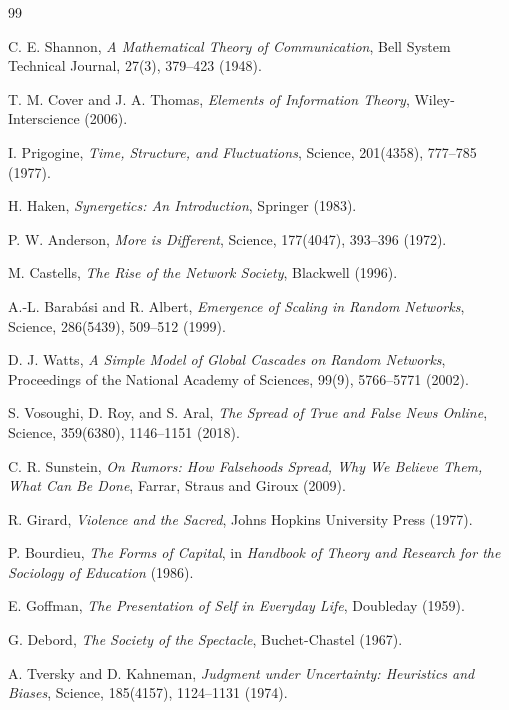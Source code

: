 \documentclass[12pt,a4paper]{article}
\begin{document}
\begin{thebibliography}{99}

C. E. Shannon,
\textit{A Mathematical Theory of Communication},
Bell System Technical Journal, 27(3), 379--423 (1948).

T. M. Cover and J. A. Thomas,
\textit{Elements of Information Theory},
Wiley-Interscience (2006).

I. Prigogine,
\textit{Time, Structure, and Fluctuations},
Science, 201(4358), 777--785 (1977).

H. Haken,
\textit{Synergetics: An Introduction},
Springer (1983).

P. W. Anderson,
\textit{More is Different},
Science, 177(4047), 393--396 (1972).

M. Castells,
\textit{The Rise of the Network Society},
Blackwell (1996).

A.-L. Barabási and R. Albert,
\textit{Emergence of Scaling in Random Networks},
Science, 286(5439), 509--512 (1999).

D. J. Watts,
\textit{A Simple Model of Global Cascades on Random Networks},
Proceedings of the National Academy of Sciences, 99(9), 5766--5771 (2002).

S. Vosoughi, D. Roy, and S. Aral,
\textit{The Spread of True and False News Online},
Science, 359(6380), 1146--1151 (2018).

C. R. Sunstein,
\textit{On Rumors: How Falsehoods Spread, Why We Believe Them, What Can Be Done},
Farrar, Straus and Giroux (2009).

R. Girard,
\textit{Violence and the Sacred},
Johns Hopkins University Press (1977).

P. Bourdieu,
\textit{The Forms of Capital},
in \textit{Handbook of Theory and Research for the Sociology of Education} (1986).

E. Goffman,
\textit{The Presentation of Self in Everyday Life},
Doubleday (1959).

G. Debord,
\textit{The Society of the Spectacle},
Buchet-Chastel (1967).

A. Tversky and D. Kahneman,
\textit{Judgment under Uncertainty: Heuristics and Biases},
Science, 185(4157), 1124--1131 (1974).


\end{thebibliography}
\end{document}
